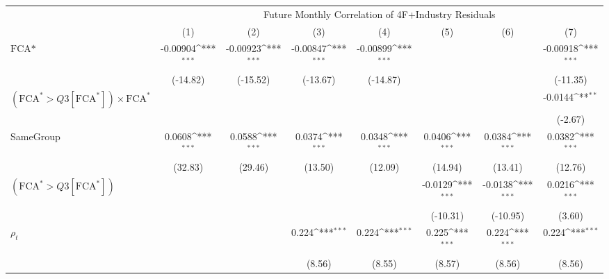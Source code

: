 {
\def\sym#1{\ifmmode^{#1}\else\(^{#1}\)\fi}
\begin{tabular}{l*{7}{c}}
\hline\hline
                &\multicolumn{7}{c}{Future Monthly Correlation of 4F+Industry Residuals}                                                             \\\cmidrule(lr){2-8}
                &\multicolumn{1}{c}{(1)}         &\multicolumn{1}{c}{(2)}         &\multicolumn{1}{c}{(3)}         &\multicolumn{1}{c}{(4)}         &\multicolumn{1}{c}{(5)}         &\multicolumn{1}{c}{(6)}         &\multicolumn{1}{c}{(7)}         \\
\hline
$ \text{FCA*} $ & -0.00904\sym{***}& -0.00923\sym{***}& -0.00847\sym{***}& -0.00899\sym{***}&                  &                  & -0.00918\sym{***}\\
                & (-14.82)         & (-15.52)         & (-13.67)         & (-14.87)         &                  &                  & (-11.35)         \\
[1em]
 $ (\text{FCA}^* > Q3[\text{FCA}^*]) \times {\text{FCA} ^*}  $ &                  &                  &                  &                  &                  &                  &  -0.0144\sym{**} \\
                &                  &                  &                  &                  &                  &                  &  (-2.67)         \\
[1em]
SameGroup       &   0.0608\sym{***}&   0.0588\sym{***}&   0.0374\sym{***}&   0.0348\sym{***}&   0.0406\sym{***}&   0.0384\sym{***}&   0.0382\sym{***}\\
                &  (32.83)         &  (29.46)         &  (13.50)         &  (12.09)         &  (14.94)         &  (13.41)         &  (12.76)         \\
[1em]
 $ (\text{FCA}^* > Q3[\text{FCA}^*]) $ &                  &                  &                  &                  &  -0.0129\sym{***}&  -0.0138\sym{***}&   0.0216\sym{***}\\
                &                  &                  &                  &                  & (-10.31)         & (-10.95)         &   (3.60)         \\
[1em]
 $ {\rho_t} $   &                  &                  &    0.224\sym{***}&    0.224\sym{***}&    0.225\sym{***}&    0.224\sym{***}&    0.224\sym{***}\\
                &                  &                  &   (8.56)         &   (8.55)         &   (8.57)         &   (8.56)         &   (8.56)         \\

\end{tabular}}
